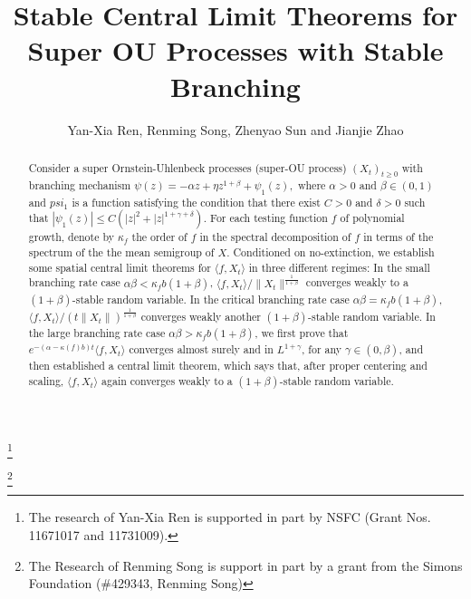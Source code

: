 \documentclass[12pt,a4paper]{amsart}
\theoremstyle{plain}
\theoremstyle{definition}
\numberwithin{equation}{section}
\begin{document}
\title
    [CLT for Super-OU processes]
    {Stable Central Limit Theorems for Super OU Processes with Stable Branching}
\author
    [Y.-X. Ren, R. Song, Z. Sun and J. Zhao]
    {Yan-Xia Ren, Renming Song, Zhenyao Sun and Jianjie Zhao}
\address
    {Yan-Xia Ren
    \\ LMAM School of Mathematical Sciences \& Center for Statistical Science
    \\ Peking University
    \\ Beijing, P. R. China, 100871}
\thanks{The research of Yan-Xia Ren is supported in part by NSFC (Grant Nos. 11671017  and 11731009).}
\address
    {Renming Song
    \\ Department of Mathematics
    \\ University of Illinois of Illinois at Urbana-Champaign
    \\ Urbana, IL 61801, USA}
\thanks{The Research of Renming Song is support in part by a grant from the Simons Foundation (\#429343, Renming Song)}
\address
    {Zhenyao Sun
    \\ School of Mathematical Sciences
    \\ Peking University
    \\ Beijing, P. R. China, 100871}
\address
    {Jianjie Zhao
    \\ School of Mathematical Sciences
    \\ Peking University
    \\ Beijing, P. R. China, 100871}
\begin{abstract}
    Consider a super Ornstein-Uhlenbeck processes (super-OU process) $(X_t)_{t\geq 0}$ with branching mechanism $\psi(z)=-\alpha z +\eta z^{1+\beta} + \psi_1(z),$ where $\alpha >0$ and $\beta\in (0,1)$ and $psi_1$ is a function satisfying the condition that there exist $C >0$ and $\delta >0$ such that $|\psi_1(z)| \leq C(|z|^2+|z|^{1+\gamma + \delta}).$
    For each testing function $f$ of polynomial growth, denote by $\kappa_f$ the order of $f$ in the spectral decomposition of $f$ in terms of the spectrum of the the mean semigroup of $X$.
    Conditioned on no-extinction, we establish some spatial central limit theorems for $\langle f, X_t \rangle$ in three different regimes:
    In the small branching rate case $\alpha\beta< \kappa_f b(1+\beta)$, $\langle f,X_t\rangle/\|X_t\|^{\frac{1}{1+\beta}}$ converges weakly to a $(1+\beta)$-stable random variable.
    In the critical branching rate case  $\alpha\beta= \kappa_f b(1+\beta)$, $\langle f,X_t\rangle/(t\|X_t\|)^{\frac{1}{1+\beta}}$ converges weakly another $(1+\beta)$-stable random variable.
    In the large branching rate case  $\alpha\beta> \kappa_f b(1+\beta)$, we first prove that $e^{-(\alpha-\kappa(f)b)t}\langle f,X_t\rangle$ converges almost surely and in $L^{1+\gamma}$, for any $\gamma \in (0,\beta)$, and then established a central limit theorem, which says that, after proper centering and scaling, $\langle f,X_t\rangle$ again converges weakly to a $(1+\beta)$-stable random variable.
\end{abstract}
\end{document}
